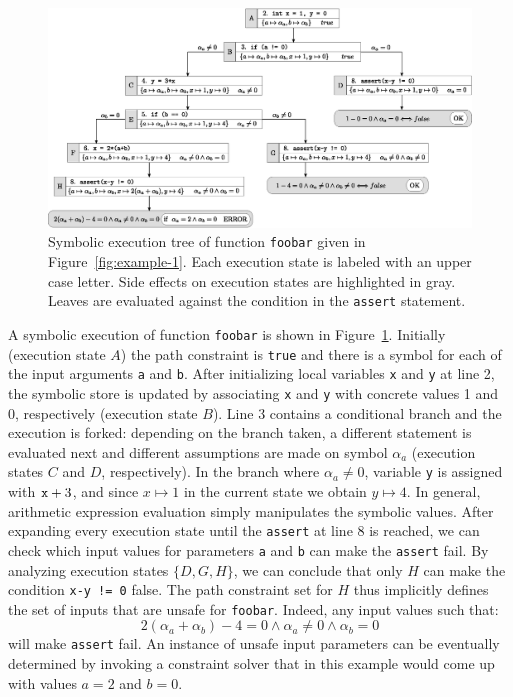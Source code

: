 \begin{figure}[t]
  \centering
  \includegraphics[width=1.0\columnwidth]{images/execution-tree.eps} 
  \caption{Symbolic execution tree of function {\tt foobar} given in Figure~\ref{fig:example-1}. Each execution state is labeled with an upper case letter. Side effects on execution states are highlighted in gray. Leaves are evaluated against the condition in the {\tt assert} statement. }
  \label{fig:example-symbolic-execution}
\end{figure}

\noindent A symbolic execution of function {\tt foobar} is shown in Figure~\ref{fig:example-symbolic-execution}. Initially (execution state $A$) the path constraint is {\tt true} and there is a symbol for each of the input arguments {\tt a} and {\tt b}. 
After initializing local variables {\tt x} and {\tt y} at line 2, the symbolic store is updated by associating {\tt x} and {\tt y} with concrete values 1 and 0, respectively (execution state $B$). Line 3 contains a conditional branch and the execution is forked: depending on the branch taken, a different statement is evaluated next and different assumptions are made on symbol $\alpha_a$ (execution states $C$ and $D$, respectively). In the branch where $\alpha_a\neq 0$, variable {\tt y} is assigned with ${\tt x}+3$, and since $x\mapsto 1$ in the current state we obtain $y\mapsto 4$. In general, arithmetic expression evaluation simply manipulates the symbolic values.
After expanding every execution state until the {\tt assert} at line 8 is reached, we can check which input values for parameters {\tt a} and {\tt b} can make the {\tt assert} fail. By analyzing execution states $\{D,G,H\}$, we can conclude that only $H$ can make the condition {\tt x-y != 0} false. The path constraint set for $H$ thus implicitly defines the set of inputs that are unsafe for {\tt foobar}. 
Indeed, any input values such that:
 \[ 2(\alpha_a+\alpha_b)-4 = 0 \wedge \alpha_a \neq 0 \wedge \alpha_b = 0 \]
will make {\tt assert} fail. An instance of unsafe input parameters can be eventually determined by invoking a constraint solver that in this example would come up with values $a = 2$ and $b = 0$. 


